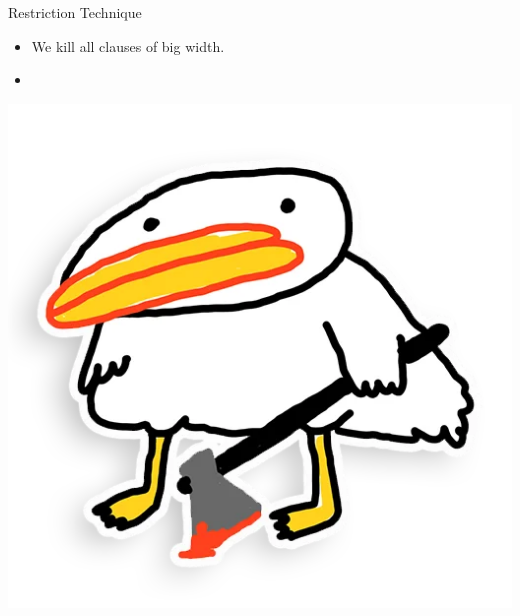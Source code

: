 \begin{frame}{Restriction Technique}
    \pause
    \vspace{0.3cm}
    \begin{minipage}{0.7\linewidth}
        \begin{itemize}
            \item We kill all clauses of big width.
            \item {}
        \end{itemize}        
    \end{minipage}
    \begin{minipage}{0.25\linewidth}
        \centering
        \includegraphics[scale = 0.1]{pics/utia-blood.png}
    \end{minipage}
\end{frame}

